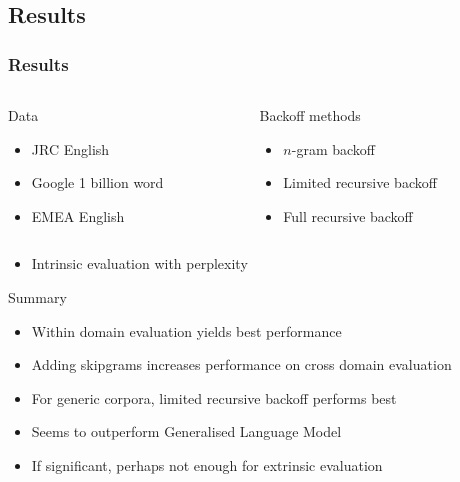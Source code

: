 \documentclass{beamer}
\begin{document}
\begin{frame}\section{Results}
    \frametitle{Results}

    \begin{columns}[T,totalwidth=\linewidth]
        \begin{column}{0.475\textwidth}
            \begin{block}{Data}
                \begin{itemize}
                    \item JRC English
                    \item Google 1 billion word
                    \item EMEA English
                \end{itemize}
            \end{block}
        \end{column}    
        \begin{column}{0.475\textwidth}
            \begin{block}{Backoff methods}
                \begin{itemize}
                    \item $n$-gram backoff
                    \item Limited recursive backoff
                    \item Full recursive backoff
                \end{itemize}
            \end{block}
        \end{column}    
    \end{columns}

    \begin{itemize}
        \item Intrinsic evaluation with perplexity
    \end{itemize}

    \begin{block}{Summary}
        \begin{itemize}
            \item Within domain evaluation yields best performance
            \item Adding skipgrams increases performance on cross domain evaluation
            \item For generic corpora, limited recursive backoff performs best
            \item Seems to outperform Generalised Language Model
            \item If significant, perhaps not enough for extrinsic evaluation
        \end{itemize}
    \end{block}
\end{frame}
\end{document}
